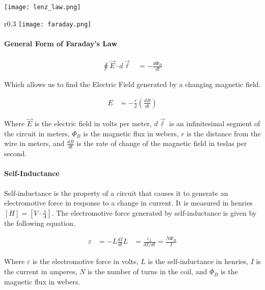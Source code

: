 \begin{center}
    \texttt{[image: lenz\_law.png]}
\end{center}


\begin{wrapfigure}[5]{r}{0.3\textwidth}
    \centering
    \texttt{[image: faraday.png]}
\end{wrapfigure}

\paragraph*{General Form of Faraday's Law}

\begin{align*}
    \oint \vec{E} \cdot d\vec{\ell} &= -\frac{d\Phi_B}{dt}
\end{align*}



Which allows us to find the Electric Field generated by a changing magnetic field.

\begin{align*}
    E &= -\frac{r}{2}(\frac{dB}{dt})
\end{align*}

Where $\vec{E}$ is the electric field in volts per meter, $d\vec{\ell}$ is an infinitesimal segment of the circuit in meters, $\Phi_B$ is the
magnetic flux in webers, $r$ is the distance from the wire in meters, and $\frac{dB}{dt}$ is the rate of change of the magnetic field in 
teslas per second.\\


\paragraph*{Self-Inductance}
Self-inductance is the property of a circuit that causes it to generate an electromotive force in response to a change in current.
It is measured in henries $[H] = [V\cdot \frac{s}{A}]$. The electromotive force generated by self-inductance is given by the following equation.

\begin{align*}
    \varepsilon &= -L\frac{dI}{dt}
    L &= \frac{\varepsilon_L}{dI/dt} = \frac{N\Phi_B}{I}
\end{align*}

Where $\varepsilon$ is the electromotive force in volts, $L$ is the self-inductance in henries, $I$ is the current in amperes, $N$ is the 
number of turns in the coil, and $\Phi_B$ is the magnetic flux in webers.\\

